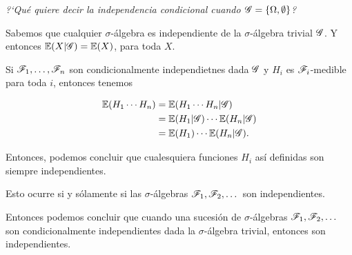 ﻿\emph{
	?`Qu\'e quiere decir la independencia condicional cuando $\mathscr{G}=\left\{  \Omega ,\emptyset\right\} $?
}
\afterstatement\pn

Sabemos que cualquier $\sigma$-álgebra es
independiente de la $\sigma$-álgebra trivial $\mathscr{G}$. Y entonces $\mathbb{E}(X | \mathscr{G}) = \mathbb{E}(X)$, para toda $X$.\pn

Si $\mathscr{F}_1, \dots, \mathscr{F}_n$ son condicionalmente independietnes dada $\mathscr{G}$ y $H_i$ es $\mathscr{F}_i$-medible para toda $i$, entonces tenemos

\begin{align}
    \mathbb{E}(H_1 \cdots H_n) &=  \mathbb{E}(H_1 \cdots H_n | \mathscr{G})            \\
                        &=  \mathbb{E}(H_1 | \mathscr{G}) \cdots \mathbb{E}(H_n | \mathscr{G})    \\
                        &=  \mathbb{E}(H_1) \cdots  \mathbb{E}(H_n | \mathscr{G}).
\end{align}

Entonces, podemos concluir que cualesquiera funciones $H_i$ así definidas son siempre
independientes.\pn

Esto ocurre si y sólamente si las $\sigma$-álgebras $\mathscr{F}_1, \mathscr{F}_2,\dots$ son independientes.\pn

Entonces podemos concluir que cuando una sucesión de $\sigma$-álgebras $\mathscr{F}_1, \mathscr{F}_2,\dots$ son condicionalmente independientes
dada la $\sigma$-álgebra trivial, entonces son independientes.